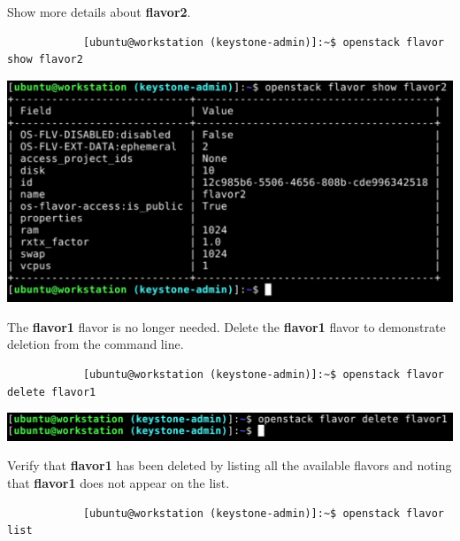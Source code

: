 \documentclass[letterpaper, 12pt]{article}
\begin{document}
\begin{enumerate}
    \begin{labstep}
        Show more details about \textbf{flavor2}.
        \begin{lstlisting}
            [ubuntu@workstation (keystone-admin)]:~$ openstack flavor show flavor2
        \end{lstlisting}

        \begin{center}
            \includegraphics[width=\linewidth]{images/part2/step10.png}
        \end{center}
    \end{labstep}

    \begin{labstep}
        The \textbf{flavor1} flavor is no longer needed.
        Delete the \textbf{flavor1} flavor to demonstrate deletion from the command line.
        \begin{lstlisting}
            [ubuntu@workstation (keystone-admin)]:~$ openstack flavor delete flavor1
        \end{lstlisting}

        \begin{center}
            \includegraphics[width=\linewidth]{images/part2/step11.png}
        \end{center}
    \end{labstep}

    \begin{labstep}
        Verify that \textbf{flavor1} has been deleted by listing all the available flavors and noting that
        \textbf{flavor1} does not appear on the list.
        \begin{lstlisting}
            [ubuntu@workstation (keystone-admin)]:~$ openstack flavor list
        \end{lstlisting}


\end{labstep}
\end{enumerate}
\end{document}
